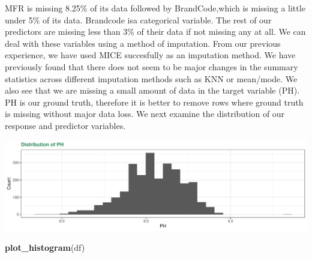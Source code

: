 \documentclass[]{report}
\newenvironment{Shaded}{\begin{snugshade}}{\end{snugshade}}
\newcommand{\CommentTok}[1]{\textcolor[rgb]{0.56,0.35,0.01}{\textit{#1}}}
\newcommand{\DataTypeTok}[1]{\textcolor[rgb]{0.13,0.29,0.53}{#1}}
\newcommand{\DecValTok}[1]{\textcolor[rgb]{0.00,0.00,0.81}{#1}}
\newcommand{\KeywordTok}[1]{\textcolor[rgb]{0.13,0.29,0.53}{\textbf{#1}}}
\newcommand{\NormalTok}[1]{#1}
\newcommand{\OperatorTok}[1]{\textcolor[rgb]{0.81,0.36,0.00}{\textbf{#1}}}
\newcommand{\StringTok}[1]{\textcolor[rgb]{0.31,0.60,0.02}{#1}}
\begin{document}
MFR is missing 8.25\% of its data followed by BrandCode,which is missing
a little under 5\% of its data. Brandcode isa categorical variable. The
rest of our predictors are missing less than 3\% of their data if not
missing any at all. We can deal with these variables using a method of
imputation. From our previous experience, we have used MICE succesfully
as an imputation method. We have previously found that there does not
seem to be major changes in the summary statistics across different
imputation methods such as KNN or mean/mode. We also see that we are
missing a small amount of data in the target variable (PH). PH is our
ground truth, therefore it is better to remove rows where ground truth
is missing without major data loss. We next examine the distribution of
our response and predictor variables.

\begin{Shaded}
\end{Shaded}

\includegraphics{Project2-VH_files/figure-latex/project2a3-1.pdf}

\begin{Shaded}
\begin{Highlighting}[]
\KeywordTok{plot_histogram}\NormalTok{(df)}
\end{Highlighting}
\end{Shaded}
\end{document}
